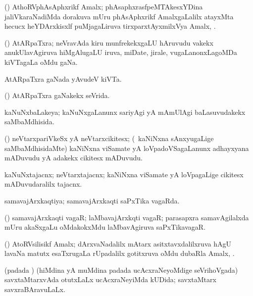 \bentry
{}
\gl{\nA}
\bmng
(\ravi) AthoRVphAsAphxrikf Amalx; phAsaphxrasfpeMTAkesxYDina jaliVkaraNadiMda dorakuva mUru phAsAphxrikf AmalxgaLalilx atayxMta hecucx heYDArxkisxlf puMjagaLiruva tirxparxtAyxmilxVya Amalx, . 
\emng
\eentry

\bentry
{}
\gl{\nA}
\bmng
(\pArxvi) AtARpaTxra; neVravAda kiru munfrekekxgaLU hAruvudu \mo vakekx anukUlavAgiruva hiMgAlugaLU iruva, miDate, jirale, \mo vugaLanonxLagoMDa kiVTagaLa oMdu gaNa. 
\emng
\eentry

\bentry
{}
\gl{\nA}
\bmng
AtARpaTxra gaNada yAvudeV kiVTa. 
\emng
\eentry

\bentry
{}
\gl{\gu}
\bmng
(\jiVvi) AtARpaTxra gaNakekx seVrida. 
\emng
\eentry

\bentry
{}
\gl{\gu}
\bmng
kaNuNxbaLakeya; kaNuNxgaLanunx sariyAgi yA mAmUlAgi baLasuvudakekx saMbaMdhisida. 
\emng
\eentry

\bentry
{}
\gl{\nA}
\bmng
(\veYshA) neVtarxpariVkeSx yA neVtarxcikitesx; (\kanmu\ kaNiNxna sAnxyugaLige saMbaMdhisidaMte) kaNiNxna viSamate yA loVpadoVSagaLanunx adhayxyana mADuvudu yA adakekx cikitesx mADuvudu. 
\emng
\eentry

\bentry
{}
\gl{\nA}
\bmng
kaNuNxtajacnx; neVtarxtajacnx; kaNiNxna viSamate yA loVpagaLige cikitesx mADuvudaralilx tajacnx. 
\emng
\eentry

\bentry
{}
\gl{\gu}
\bmng
samavajArxkaqtiya; samavajArxkaqti saPxTika vagaRda. 
\emng
\eentry

\bentry
{}
\gl{\nA}
\bmng
(\saPxvi) samavajArxkaqti vagaR; laMbavajArxkqti vagaR; parasapxra samavAgilalxda mUru akaSxgaLu oMdakokxMdu laMbavAgiruva saPxTikavagaR. 
\emng
\eentry

\bentry
{}
\gl{\nA}
\bmng
(\ravi) AtoRVsilisikf Amalx; dArxvaNadalilx mAtarx asitxtavxdalilxruva hAgU lavaNa matutx esaTxrugaLa rUpadalilx gotitxruva oMdu dubaRla Amalx, . 
\emng
\eentry

\bentry
{}
\gl{\gu}
\bmng
(padada \vi) (hiMdina yA muMdina padada ucAcxraNeyoMdige seVrihoVgada) savxtaMtarxvAda otutxLaLx ucAcxraNeyiMda kUDida; savxtaMtarx savxraBAravuLaLx. 
\emng
\eentry

